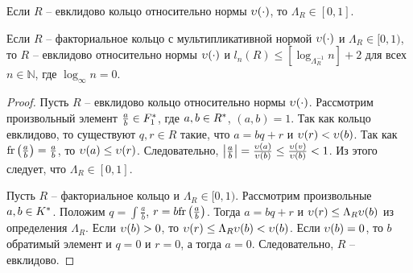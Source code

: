 \documentclass[_00_dissertation.tex]{subfiles}
\begin{document}
\begin{theorem}\label{theorem:euclidean_and_lambda}
    Если $R$ -- евклидово кольцо относительно нормы $\upsilon(\cdot)$, то $\Lambda_R \in [0, 1]$.

    Если $R$ -- факториальное кольцо с мультипликативной нормой $\upsilon(\cdot)$ и $\Lambda_R \in [0, 1)$, то $R$ -- евклидово относительно нормы $\upsilon(\cdot)$ и $l_n(R) \le [\log_{\Lambda_R^{-1}} n] + 2$ для всех $n \in \mathbb{N}$, где $\log_{\infty} n = 0$.
\end{theorem}
\begin{proof}
    Пусть $R$ -- евклидово кольцо относительно нормы $\upsilon(\cdot)$.
    Рассмотрим произвольный элемент $\frac{a}{b} \in F_1^{*}$, где $a, b \in R^{*}$, $(a, b) = 1$.
    Так как кольцо евклидово, то существуют $q, r \in R$ такие, что $a = bq + r$ и $\upsilon(r) < \upsilon(b)$.
    Так как $\textrm{fr}\left(\frac{a}{b}\right) = \frac{a}{b}$, то $\upsilon(a) \le \upsilon(r)$.
    Следовательно, $\left|\frac{a}{b}\right| = \frac{\upsilon(a)}{\upsilon(b)} \le \frac{\upsilon(v)}{\upsilon(b)} < 1$.
    Из этого следует, что $\Lambda_R \in [0, 1]$.

    Пусть $R$ -- факториальное кольцо и $\Lambda_R \in [0, 1)$.
    Рассмотрим произвольные $a, b \in K^{*}$.
    Положим $q = \int{\frac{a}{b}}$, $r = b\textrm{fr}\left(\frac{a}{b}\right)$.
    Тогда $a = bq + r$ и $\upsilon(r) \le \Lambda_R \upsilon(b)$ из определения $\Lambda_R$.
    Если $\upsilon(b) > 0$, то $\upsilon(r) \le \Lambda_R \upsilon(b) < \upsilon(b)$.
    Если $\upsilon(b) = 0$, то $b$ обратимый элемент и $q = 0$ и $r = 0$, а тогда $a = 0$.
    Следовательно, $R$ -- евклидово.
\end{proof}
\end{document}
